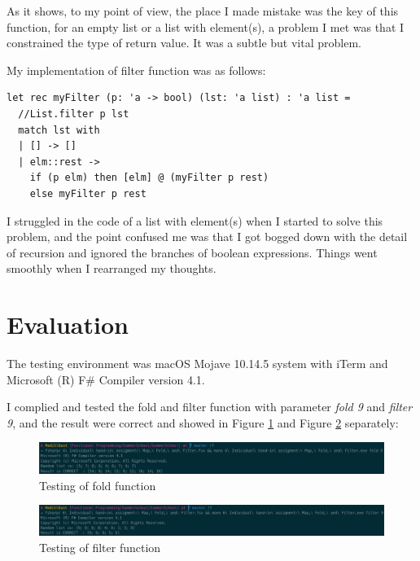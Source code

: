 \documentclass{article}
\begin{document}
As it shows, to my point of view, the place I made mistake was the key of this function, for an empty list or a list with element(s), a problem I met was that I constrained the type of return value. It was a subtle but vital problem.

My implementation of filter function was as follows:

\begin{lstlisting}
let rec myFilter (p: 'a -> bool) (lst: 'a list) : 'a list =
  //List.filter p lst
  match lst with
  | [] -> []
  | elm::rest -> 
    if (p elm) then [elm] @ (myFilter p rest)
    else myFilter p rest
\end{lstlisting}

I struggled in the code of a list with element(s) when I started to solve this problem, and the point confused me was that I got bogged down with the detail of recursion and ignored the branches of boolean expressions. Things went smoothly when I rearranged my thoughts.

\section{Evaluation}

The testing environment was macOS Mojave 10.14.5 system with iTerm and Microsoft (R) F\# Compiler version 4.1.

I complied and tested the fold and filter function with parameter \emph{fold 9} and \emph{filter 9}, and the result were correct and showed in Figure \ref{fig:fold} and Figure \ref{fig:filter} separately:

\begin{figure}[h]
      \centering
      \includegraphics[width=\linewidth]{fold2}
      \caption{Testing of fold function}
      \label{fig:fold}
\end{figure}

\begin{figure}[h]
      \centering
      \includegraphics[width=\linewidth]{filter2}
      \caption{Testing of filter function}
      \label{fig:filter}
\end{figure}
\end{document}
